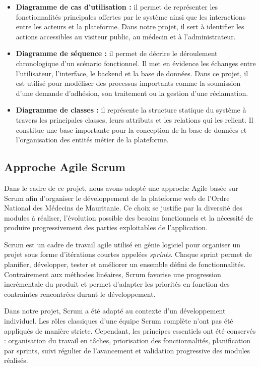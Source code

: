 ﻿\documentclass[12pt,a4paper]{report}
\begin{document}
\begin{itemize}
    \item \textbf{Diagramme de cas d’utilisation :} il permet de représenter
    les fonctionnalités principales offertes par le système ainsi que les
    interactions entre les acteurs et la plateforme. Dans notre projet, il
    sert à identifier les actions accessibles au visiteur public, au médecin
    et à l’administrateur.

    \item \textbf{Diagramme de séquence :} il permet de décrire le déroulement
    chronologique d’un scénario fonctionnel. Il met en évidence les échanges
    entre l’utilisateur, l’interface, le backend et la base de données. Dans
    ce projet, il est utilisé pour modéliser des processus importants comme
    la soumission d’une demande d’adhésion, son traitement ou la gestion
    d’une réclamation.

    \item \textbf{Diagramme de classes :} il représente la structure statique
    du système à travers les principales classes, leurs attributs et les
    relations qui les relient. Il constitue une base importante pour la
    conception de la base de données et l’organisation des entités métier de
    la plateforme.
\end{itemize}
\subsection{Approche Agile Scrum}

Dans le cadre de ce projet, nous avons adopté une approche Agile basée sur
Scrum afin d'organiser le développement de la plateforme web de l'Ordre
National des Médecins de Mauritanie. Ce choix se justifie par la diversité
des modules à réaliser, l'évolution possible des besoins fonctionnels et la
nécessité de produire progressivement des parties exploitables de
l'application.

Scrum est un cadre de travail agile utilisé en génie logiciel pour organiser
un projet sous forme d'itérations courtes appelées \textit{sprints}. Chaque
sprint permet de planifier, développer, tester et améliorer un ensemble
défini de fonctionnalités. Contrairement aux méthodes linéaires, Scrum
favorise une progression incrémentale du produit et permet d'adapter les
priorités en fonction des contraintes rencontrées durant le développement.

Dans notre projet, Scrum a été adapté au contexte d'un développement
individuel. Les rôles classiques d'une équipe Scrum complète n'ont pas
été appliqués de manière stricte. Cependant, les principes essentiels ont
été conservés : organisation du travail en tâches, priorisation des
fonctionnalités, planification par sprints, suivi régulier de l'avancement
et validation progressive des modules réalisés.
\end{document}
